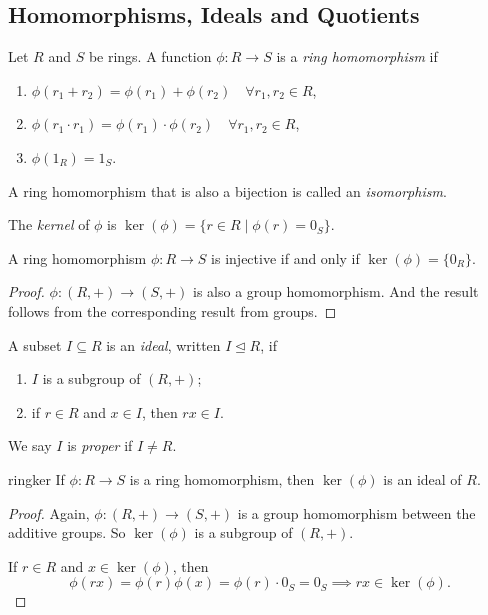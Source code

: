 \subsection{Homomorphisms, Ideals and Quotients}
\leavevmode
\begin{definition}{}{}
    Let \(R\) and \(S\) be rings. A function \(\phi: R \to S\) is a \textit{ring homomorphism} if
    \begin{enumerate}
        \item \(\phi(r_1 + r_2) = \phi(r_1) + \phi(r_2)\quad \forall r_1, r_2 \in R\),
        \item \(\phi(r_1\cdot r_1) = \phi(r_1)\cdot \phi(r_2) \quad \forall r_1, r_2 \in R\),
        \item \(\phi(1_R) = 1_S\).
    \end{enumerate}
    A ring homomorphism that is also a bijection is called an \textit{isomorphism}.

    The \textit{kernel} of \(\phi\) is \(\ker(\phi) = \{r\in R\mid \phi(r) = 0_S\}\).
\end{definition}
\begin{lemma}{}{}
    A ring homomorphism \(\phi:R \to S\) is injective if and only if \(\ker(\phi) = \{0_R\}\).
\end{lemma}
\begin{proof}
    \(\phi: (R, +) \to (S, +)\) is also a group homomorphism. And the result follows from the corresponding result from groups.
\end{proof}
\begin{definition}{}{}
    A subset \(I \subseteq R\) is an \textit{ideal}, written \(I \trianglelefteq R\), if
    \begin{enumerate}
        \item \(I\) is a subgroup of \((R, +)\);
        \item if \(r \in R\) and \(x \in I\), then \(rx \in I\).
    \end{enumerate}
    We say \(I\) is \textit{proper} if \(I \neq R\).
\end{definition}
\begin{lemma}{}{ringker}
    If \(\phi: R\to S\) is a ring homomorphism, then \(\ker(\phi)\) is an ideal of \(R\).
\end{lemma}
\begin{proof}
    Again, \(\phi: (R, +) \to (S, +)\) is a group homomorphism between the additive groups. So \(\ker(\phi)\) is a subgroup of \((R, +)\).

    If \(r \in R\) and \(x \in \ker(\phi)\), then
    \[
        \phi(rx) = \phi(r)\phi(x) = \phi(r)\cdot 0_S = 0_S \implies rx \in \ker(\phi).
    \]
\end{proof}
